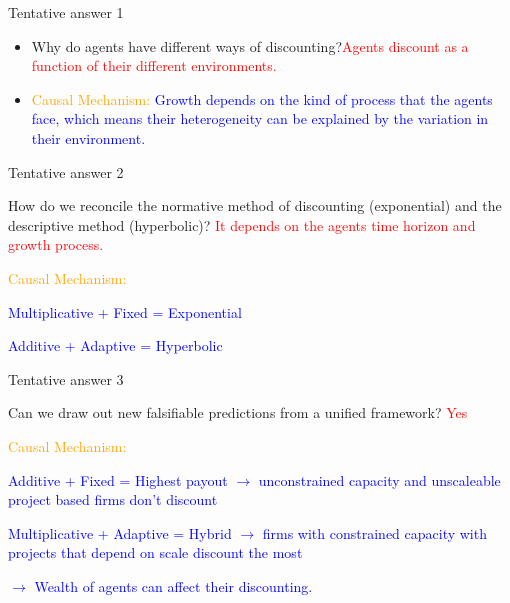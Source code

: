 \documentclass{beamer}
\numberwithin{equation}{section}
\begin{document}
\begin{frame}{Tentative answer 1}
\begin{itemize}
    \item Why do agents have different ways of discounting?\textcolor{red}{Agents discount as a function of their different environments.}
    \item \textcolor{orange}{Causal Mechanism:} \textcolor{blue}{Growth depends on the kind of process that the agents face, which means their heterogeneity can be explained by the variation in their environment.}
\end{itemize}
\end{frame}
\begin{frame}{Tentative answer 2}
\begin{itemize}
    \item How do we reconcile the normative method of discounting (exponential) and the descriptive method (hyperbolic)? \textcolor{red}{It depends on the agents time horizon and growth process.}
    \item \textcolor{orange}{Causal Mechanism:} \textcolor{blue}{
    \item Multiplicative + Fixed = Exponential
    \item Additive + Adaptive = Hyperbolic}
\end{itemize}
\end{frame}
\begin{frame}{Tentative answer 3}
\begin{itemize}
    \item Can we draw out new falsifiable predictions from a unified framework? \textcolor{red}{Yes}
    \item \textcolor{orange}{Causal Mechanism:} \textcolor{blue}{
    \item Additive + Fixed = Highest payout $\rightarrow$ unconstrained capacity and unscaleable project based firms don't discount
    \item Multiplicative + Adaptive = Hybrid $\rightarrow$ firms with constrained capacity with projects that depend on scale discount the most
    \item $\rightarrow$ Wealth of agents can affect their discounting. } 
\end{itemize}
\end{frame}
\end{document}
